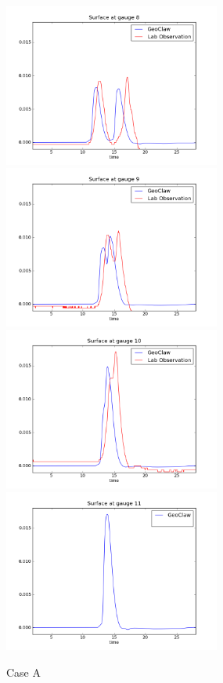 \begin{figure}[ht]
\vskip 5pt
\hfil\includegraphics[width=2.8in]{bp5/CaseA/gauge0008fig300.png}\hfil
\hfil\includegraphics[width=2.8in]{bp5/CaseA/gauge0009fig300.png}\hfil
\vskip 5pt
\hfil\includegraphics[width=2.8in]{bp5/CaseA/gauge0010fig300.png}\hfil
\hfil\includegraphics[width=2.8in]{bp5/CaseA/gauge0011fig300.png}\hfil
\caption{\label{fig:bp5A} Case A }
\end{figure}

